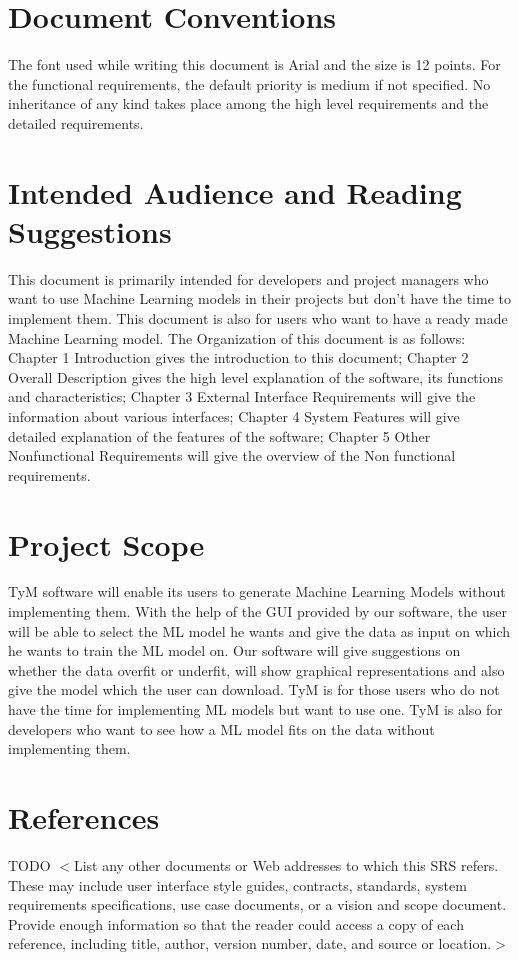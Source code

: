 \documentclass{scrreprt}
\begin{document}
\section{Document Conventions}
The font used while writing this document is Arial and the size is 12 points. For the functional requirements, the default priority is medium if not specified. No inheritance of any kind takes place among the high level requirements and the detailed requirements.

\section{Intended Audience and Reading Suggestions}
This document is primarily intended for developers and project managers who want to use Machine Learning models in their projects but don't have the time to implement them. This document is also for users who want to have a ready made Machine Learning model. The Organization of this document is as follows: Chapter 1 Introduction gives the introduction to this document; Chapter 2 Overall Description gives the high level explanation of the software, its functions and characteristics; Chapter 3 External Interface Requirements will give the information about various interfaces; Chapter 4 System Features will give detailed explanation of the features of the software; Chapter 5 Other Nonfunctional Requirements will give the overview of the Non functional requirements.

\section{Project Scope}
TyM software will enable its users to generate Machine Learning Models without implementing them. With the help of the GUI provided by our software, the user will be able to select the ML model he wants and give the data as input on which he wants to train the ML model on. Our software will give suggestions on whether the data overfit or underfit, will show graphical representations and also give the model which the user can download. TyM is for those users who do not have the time for implementing ML models but want to use one. TyM is also for developers who want to see how a ML model fits on the data without implementing them.

\section{References}
TODO
$<$List any other documents or Web addresses to which this SRS refers. These may 
include user interface style guides, contracts, standards, system requirements 
specifications, use case documents, or a vision and scope document. Provide 
enough information so that the reader could access a copy of each reference, 
including title, author, version number, date, and source or location.$>$
\end{document}
